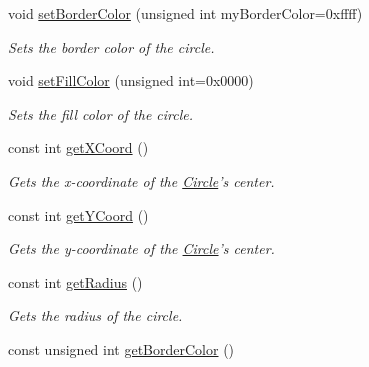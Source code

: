 \begin{DoxyCompactItemize}
void \hyperlink{class_circle_a2d0e705f07a4cb6a9d47eb759c73c59f}{set\+Border\+Color} (unsigned int my\+Border\+Color=0xffff)
\begin{DoxyCompactList}\small\item\em Sets the border color of the circle. \end{DoxyCompactList}\item 
void \hyperlink{class_circle_ab5f942fd85063fbb4bfc28fc4e700eca}{set\+Fill\+Color} (unsigned int=0x0000)
\begin{DoxyCompactList}\small\item\em Sets the fill color of the circle. \end{DoxyCompactList}\item 
\hypertarget{class_circle_a38f435815da3ce2ed7ebfe43c0f8ce58}{const int \hyperlink{class_circle_a38f435815da3ce2ed7ebfe43c0f8ce58}{get\+X\+Coord} ()}\label{class_circle_a38f435815da3ce2ed7ebfe43c0f8ce58}

\begin{DoxyCompactList}\small\item\em Gets the x-\/coordinate of the \hyperlink{class_circle}{Circle}'s center. \end{DoxyCompactList}\item 
\hypertarget{class_circle_a78f03defad16be82d0f110f6ad2e4f4d}{const int \hyperlink{class_circle_a78f03defad16be82d0f110f6ad2e4f4d}{get\+Y\+Coord} ()}\label{class_circle_a78f03defad16be82d0f110f6ad2e4f4d}

\begin{DoxyCompactList}\small\item\em Gets the y-\/coordinate of the \hyperlink{class_circle}{Circle}'s center. \end{DoxyCompactList}\item 
\hypertarget{class_circle_a4fee50b67efc5b5e188e92379140bb42}{const int \hyperlink{class_circle_a4fee50b67efc5b5e188e92379140bb42}{get\+Radius} ()}\label{class_circle_a4fee50b67efc5b5e188e92379140bb42}

\begin{DoxyCompactList}\small\item\em Gets the radius of the circle. \end{DoxyCompactList}\item 
\hypertarget{class_circle_ad6ce91ec588489091a42d02dda0b074a}{const unsigned int \hyperlink{class_circle_ad6ce91ec588489091a42d02dda0b074a}{get\+Border\+Color} ()}\label{class_circle_ad6ce91ec588489091a42d02dda0b074a}


\end{DoxyCompactItemize}

